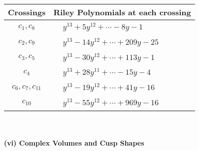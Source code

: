 \documentclass[1p]{elsarticle_modified}
\theoremstyle{definition}
\begin{document}
\begin{tabular}{m{50pt}|m{274pt}}
Crossings & \hspace{64pt}Riley Polynomials at each crossing \\
\hline $$\begin{aligned}c_{1},c_{8}\end{aligned}$$&$\begin{aligned}
&y^{13}+5 y^{12}+\cdots-8 y-1
\end{aligned}$\\
\hline $$\begin{aligned}c_{2},c_{9}\end{aligned}$$&$\begin{aligned}
&y^{13}-14 y^{12}+\cdots+209 y-25
\end{aligned}$\\
\hline $$\begin{aligned}c_{3},c_{5}\end{aligned}$$&$\begin{aligned}
&y^{13}-30 y^{12}+\cdots+113 y-1
\end{aligned}$\\
\hline $$\begin{aligned}c_{4}\end{aligned}$$&$\begin{aligned}
&y^{13}+28 y^{11}+\cdots-15 y-4
\end{aligned}$\\
\hline $$\begin{aligned}c_{6},c_{7},c_{11}\end{aligned}$$&$\begin{aligned}
&y^{13}-19 y^{12}+\cdots+41 y-16
\end{aligned}$\\
\hline $$\begin{aligned}c_{10}\end{aligned}$$&$\begin{aligned}
&y^{13}-55 y^{12}+\cdots+969 y-16
\end{aligned}$\\
\hline
\end{tabular}\\~\\
\newpage\flushleft \textbf{(vi) Complex Volumes and Cusp Shapes}
\end{document}

